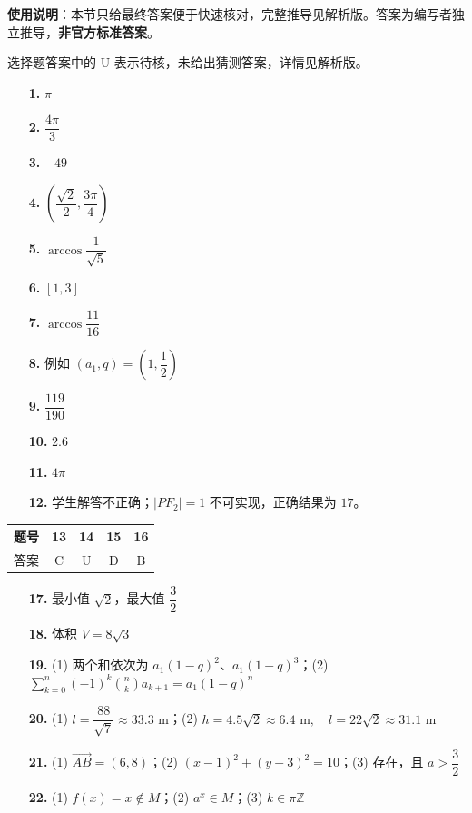 
\begin{gknotice}
\textbf{使用说明}：本节只给最终答案便于快速核对，完整推导见解析版。答案为编写者独立推导，\textbf{非官方标准答案}。
\end{gknotice}

\begin{gknotice}
选择题答案中的 U 表示待核，未给出猜测答案，详情见解析版。
\end{gknotice}

\begin{itemize}[leftmargin=2.6em]
  \item[\textbf{1.}] \(\pi\)
  \item[\textbf{2.}] \(\dfrac{4\pi}{3}\)
  \item[\textbf{3.}] \(-49\)
  \item[\textbf{4.}] \(\left(\dfrac{\sqrt2}{2},\dfrac{3\pi}{4}\right)\)
  \item[\textbf{5.}] \(\arccos\dfrac1{\sqrt5}\)
  \item[\textbf{6.}] \([1,3]\)
  \item[\textbf{7.}] \(\arccos\dfrac{11}{16}\)
  \item[\textbf{8.}] 例如 \((a_1,q)=\left(1,\dfrac12\right)\)
  \item[\textbf{9.}] \(\dfrac{119}{190}\)
  \item[\textbf{10.}] \(2.6\)
  \item[\textbf{11.}] \(4\pi\)
  \item[\textbf{12.}] 学生解答不正确；\(|PF_2|=1\) 不可实现，正确结果为 \(17\)。
\end{itemize}

\begin{center}\begin{tabular}{ccccc}
\toprule
题号 & 13 & 14 & 15 & 16 \\
\midrule
答案 & C & U & D & B \\
\bottomrule
\end{tabular}\end{center}

\begin{itemize}[leftmargin=2.6em]
  \item[\textbf{17.}] 最小值 \(\sqrt2\)，最大值 \(\dfrac32\)
  \item[\textbf{18.}] 体积 \(V=8\sqrt3\)
  \item[\textbf{19.}] (1) 两个和依次为 \(a_1(1-q)^2\)、\(a_1(1-q)^3\)；(2) \(\sum_{k=0}^{n}(-1)^k\binom nk a_{k+1}=a_1(1-q)^n\)
  \item[\textbf{20.}] (1) \(l=\dfrac{88}{\sqrt7}\approx33.3\text{ m}\)；(2) \(h=4.5\sqrt2\approx6.4\text{ m},\quad l=22\sqrt2\approx31.1\text{ m}\)
  \item[\textbf{21.}] (1) \(\overrightarrow{AB}=(6,8)\)；(2) \((x-1)^2+(y-3)^2=10\)；(3) 存在，且 \(a>\dfrac32\)
  \item[\textbf{22.}] (1) \(f(x)=x\notin M\)；(2) \(a^x\in M\)；(3) \(k\in\pi\mathbb Z\)
\end{itemize}
